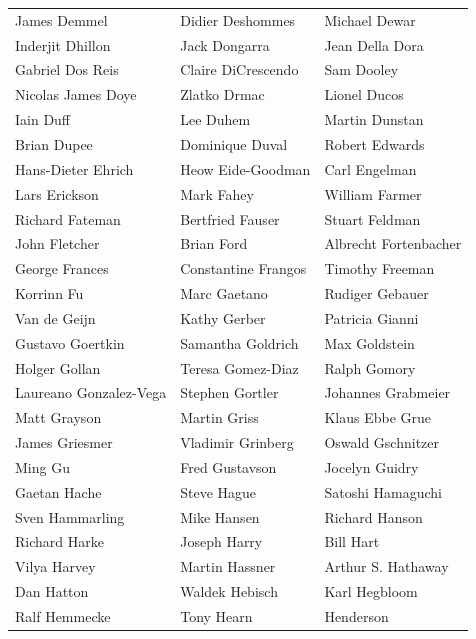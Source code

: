 \begin{tabular}{lll}
James Demmel           & Didier Deshommes       & Michael Dewar\\
Inderjit Dhillon       & Jack Dongarra          & Jean Della Dora\\
Gabriel Dos Reis       & Claire DiCrescendo     & Sam Dooley\\
Nicolas James Doye     & Zlatko Drmac           & Lionel Ducos\\
Iain Duff              & Lee Duhem              & Martin Dunstan\\
Brian Dupee            & Dominique Duval        & Robert Edwards\\
Hans-Dieter Ehrich     & Heow Eide-Goodman      & Carl Engelman\\
Lars Erickson          & Mark Fahey             & William Farmer\\
Richard Fateman        & Bertfried Fauser       & Stuart Feldman\\
John Fletcher          & Brian Ford             & Albrecht Fortenbacher\\
George Frances         & Constantine Frangos    & Timothy Freeman\\
Korrinn Fu             & Marc Gaetano           & Rudiger Gebauer\\
Van de Geijn           & Kathy Gerber           & Patricia Gianni\\
Gustavo Goertkin       & Samantha Goldrich      & Max Goldstein\\
Holger Gollan          & Teresa Gomez-Diaz      & Ralph Gomory\\
Laureano Gonzalez-Vega & Stephen Gortler        & Johannes Grabmeier\\
Matt Grayson           & Martin Griss           & Klaus Ebbe Grue\\
James Griesmer         & Vladimir Grinberg      & Oswald Gschnitzer\\
Ming Gu                & Fred Gustavson         & Jocelyn Guidry\\
Gaetan Hache           & Steve Hague            & Satoshi Hamaguchi\\
Sven Hammarling        & Mike Hansen            & Richard Hanson\\
Richard Harke          & Joseph Harry           & Bill Hart\\
Vilya Harvey           & Martin Hassner         & Arthur S. Hathaway\\
Dan Hatton             & Waldek Hebisch         & Karl Hegbloom\\
Ralf Hemmecke          & Tony Hearn             & Henderson\\

\end{tabular}

